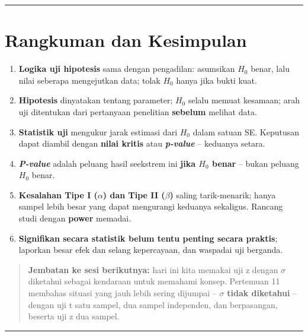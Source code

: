 \documentclass[
  indonesian,
  letterpaper,
]{book}
\providecommand{\tightlist}{%
  \setlength{\itemsep}{0pt}\setlength{\parskip}{0pt}}
\begin{document}
\begin{center}\rule{0.5\linewidth}{0.5pt}\end{center}


\chapter{Rangkuman dan Kesimpulan}\label{rangkuman-dan-kesimpulan-1}

\begin{enumerate}
\def\labelenumi{\arabic{enumi}.}
\tightlist
\item
  \textbf{Logika uji hipotesis} sama dengan pengadilan: asumsikan
  \(H_0\) benar, lalu nilai seberapa mengejutkan data; tolak \(H_0\)
  hanya jika bukti kuat.
\item
  \textbf{Hipotesis} dinyatakan tentang parameter; \(H_0\) selalu memuat
  kesamaan; arah uji ditentukan dari pertanyaan penelitian
  \textbf{sebelum} melihat data.
\item
  \textbf{Statistik uji} mengukur jarak estimasi dari \(H_0\) dalam
  satuan SE. Keputusan dapat diambil dengan \textbf{nilai kritis} atau
  \textbf{\emph{p-value}} -- keduanya setara.
\item
  \textbf{\emph{P-value}} adalah peluang hasil seekstrem ini
  \textbf{jika \(H_0\) benar} -- bukan peluang \(H_0\) benar.
\item
  \textbf{Kesalahan Tipe I (\(\alpha\)) dan Tipe II (\(\beta\))} saling
  tarik-menarik; hanya sampel lebih besar yang dapat mengurangi keduanya
  sekaligus. Rancang studi dengan \textbf{power} memadai.
\item
  \textbf{Signifikan secara statistik belum tentu penting secara
  praktis}; laporkan besar efek dan selang kepercayaan, dan waspadai uji
  berganda.
\end{enumerate}

\begin{quote}
\textbf{Jembatan ke sesi berikutnya:} hari ini kita memakai uji z dengan
\(\sigma\) diketahui sebagai kendaraan untuk memahami konsep. Pertemuan
11 membahas situasi yang jauh lebih sering dijumpai -- \(\sigma\)
\textbf{tidak diketahui} -- dengan uji t satu sampel, dua sampel
independen, dan berpasangan, beserta uji z dua sampel.
\end{quote}

\begin{center}\rule{0.5\linewidth}{0.5pt}\end{center}
\end{document}
